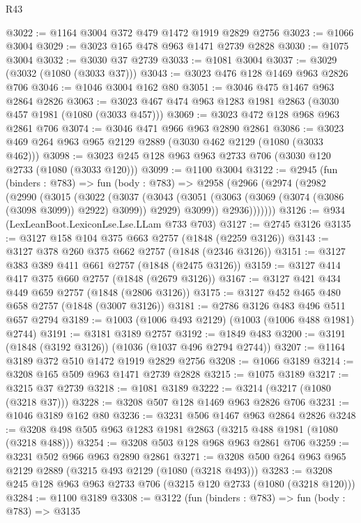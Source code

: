 \begin{lexlean}{R43}
\begin{coremodule}
@3022 := @1164 @3004 @372 @479 @1472 @1919 @2829 @2756
@3023 := @1066 @3004
@3029 := @3023 @165 @478 @963 @1471 @2739 @2828
@3030 := @1075 @3004
@3032 := @3030 @37 @2739
@3033 := @1081 @3004
@3037 := @3029 (@3032 (@1080 (@3033 @37)))
@3043 := @3023 @476 @128 @1469 @963 @2826 @706
@3046 := @1046 @3004 @162 @80
@3051 := @3046 @475 @1467 @963 @2864 @2826
@3063 := @3023 @467 @474 @963 @1283 @1981 @2863 (@3030 @457 @1981 (@1080 (@3033 @457)))
@3069 := @3023 @472 @128 @968 @963 @2861 @706
@3074 := @3046 @471 @966 @963 @2890 @2861
@3086 := @3023 @469 @264 @963 @965 @2129 @2889 (@3030 @462 @2129 (@1080 (@3033 @462)))
@3098 := @3023 @245 @128 @963 @963 @2733 @706 (@3030 @120 @2733 (@1080 (@3033 @120)))
@3099 := @1100 @3004
@3122 := @2945
    (fun (binders : @783) =>
    fun (body : @783) =>
    @2958
      (@2966
        (@2974
          (@2982
            (@2990
              (@3015
                (@3022
                  (@3037
                    (@3043
                      (@3051 (@3063 (@3069 (@3074 (@3086 (@3098 @3099)) @2922) @3099)) @2929)
                      @3099))
                  @2936)))))))
@3126 := @934 (LexLeanBoot.LexiconLse.Lse.LLam @733 @703)
@3127 := @2745 @3126
@3135 := @3127 @158 @104 @375 @663 @2757 (@1848 (@2259 @3126))
@3143 := @3127 @378 @260 @375 @662 @2757 (@1848 (@2346 @3126))
@3151 := @3127 @383 @389 @411 @661 @2757 (@1848 (@2475 @3126))
@3159 := @3127 @414 @417 @375 @660 @2757 (@1848 (@2679 @3126))
@3167 := @3127 @421 @434 @449 @659 @2757 (@1848 (@2806 @3126))
@3175 := @3127 @452 @465 @480 @658 @2757 (@1848 (@3007 @3126))
@3181 := @2786 @3126 @483 @496 @511 @657 @2794
@3189 := @1003 (@1006 @493 @2129) (@1003 (@1006 @488 @1981) @2744)
@3191 := @3181 @3189 @2757
@3192 := @1849 @483
@3200 := @3191 (@1848 (@3192 @3126)) (@1036 (@1037 @496 @2794 @2744))
@3207 := @1164 @3189 @372 @510 @1472 @1919 @2829 @2756
@3208 := @1066 @3189
@3214 := @3208 @165 @509 @963 @1471 @2739 @2828
@3215 := @1075 @3189
@3217 := @3215 @37 @2739
@3218 := @1081 @3189
@3222 := @3214 (@3217 (@1080 (@3218 @37)))
@3228 := @3208 @507 @128 @1469 @963 @2826 @706
@3231 := @1046 @3189 @162 @80
@3236 := @3231 @506 @1467 @963 @2864 @2826
@3248 := @3208 @498 @505 @963 @1283 @1981 @2863 (@3215 @488 @1981 (@1080 (@3218 @488)))
@3254 := @3208 @503 @128 @968 @963 @2861 @706
@3259 := @3231 @502 @966 @963 @2890 @2861
@3271 := @3208 @500 @264 @963 @965 @2129 @2889 (@3215 @493 @2129 (@1080 (@3218 @493)))
@3283 := @3208 @245 @128 @963 @963 @2733 @706 (@3215 @120 @2733 (@1080 (@3218 @120)))
@3284 := @1100 @3189
@3308 := @3122
    (fun (binders : @783) =>
    fun (body : @783) =>
    @3135

\end{coremodule}
\end{lexlean}
